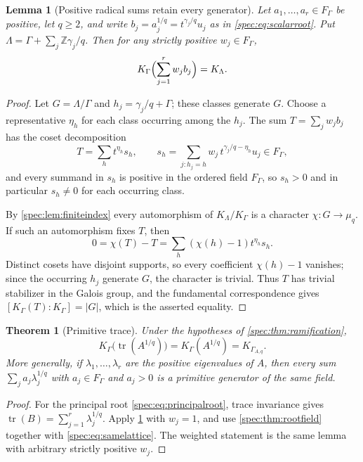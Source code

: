 \documentclass[11pt,a4paper]{article}
\numberwithin{equation}{section}
\newtheorem{theorem}{Theorem}[section]
\newtheorem{lemma}[lemma]{Lemma}
\theoremstyle{definition}
\theoremstyle{remark}
\newcommand{\Z}{\mathbb Z}
\newcommand{\tr}{\operatorname{tr}}
\begin{document}
\begin{lemma}[Positive radical sums retain every generator]\label{spec:lem:positivetrace}
Let $a_1,\ldots,a_r\in F_\Gamma$ be positive, let $q\ge2$, and write
$b_j=a_j^{1/q}=t^{\gamma_j/q}u_j$ as in \eqref{spec:eq:scalarroot}. Put
$\Lambda=\Gamma+\sum_j\Z\gamma_j/q$. Then for any strictly positive
$w_j\in F_\Gamma$,
\begin{equation}\label{spec:eq:positivesum}
 K_\Gamma\Bigl(\sum_{j=1}^rw_jb_j\Bigr)=K_\Lambda.
\end{equation}
\end{lemma}
\begin{proof}
Let $G=\Lambda/\Gamma$ and $h_j=\gamma_j/q+\Gamma$; these classes generate
$G$. Choose a representative $\eta_h$ for each class occurring among the
$h_j$. The sum $T=\sum_jw_jb_j$ has the coset decomposition
\[
 T=\sum_ht^{\eta_h}s_h,\qquad
 s_h=\sum_{j:h_j=h}w_j\,t^{\gamma_j/q-\eta_h}u_j\in F_\Gamma,
\]
and every summand in $s_h$ is positive in the ordered field $F_\Gamma$, so
$s_h>0$ and in particular $s_h\ne0$ for each occurring class.

By \cref{spec:lem:finiteindex} every automorphism of $K_\Lambda/K_\Gamma$ is
a character $\chi:G\to\mu_q$. If such an automorphism fixes $T$, then
\[
 0=\chi(T)-T=\sum_h(\chi(h)-1)t^{\eta_h}s_h.
\]
Distinct cosets have disjoint supports, so every coefficient $\chi(h)-1$
vanishes; since the occurring $h_j$ generate $G$, the character is trivial.
Thus $T$ has trivial stabilizer in the Galois group, and the fundamental
correspondence gives $[K_\Gamma(T):K_\Gamma]=|G|$, which is the asserted
equality.
\end{proof}

\begin{theorem}[Primitive trace]\label{spec:thm:primitivetrace}
Under the hypotheses of \cref{spec:thm:ramification},
\begin{equation}\label{spec:eq:tracemain}
 K_\Gamma\bigl(\tr(A^{1/q})\bigr)=K_\Gamma(A^{1/q})=K_{\Gamma_{A,q}}.
\end{equation}
More generally, if $\lambda_1,\ldots,\lambda_r$ are the positive eigenvalues
of $A$, then every sum $\sum_ja_j\lambda_j^{1/q}$ with $a_j\in F_\Gamma$ and
$a_j>0$ is a primitive generator of the same field.
\end{theorem}
\begin{proof}
For the principal root \eqref{spec:eq:principalroot}, trace invariance gives
$\tr(B)=\sum_{j=1}^r\lambda_j^{1/q}$. Apply
\cref{spec:lem:positivetrace} with $w_j=1$, and use
\cref{spec:thm:rootfield} together with \eqref{spec:eq:samelattice}. The
weighted statement is the same lemma with arbitrary strictly positive
$w_j$.
\end{proof}
\end{document}
